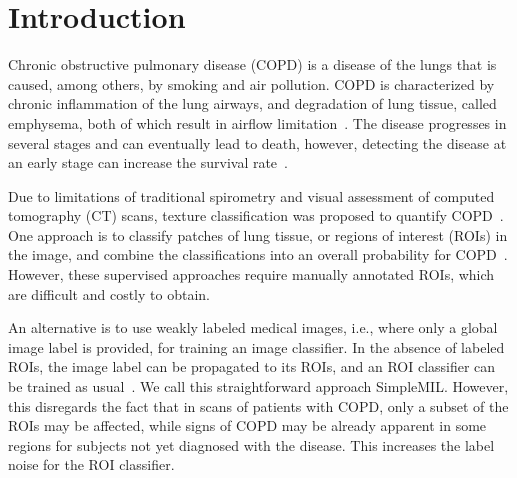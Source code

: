 \documentclass[10pt,conference,a4paper]{IEEEtran}
\begin{document}
%


\section{Introduction}\label{sec:intro}


Chronic obstructive pulmonary disease (COPD) is a disease of the lungs that is caused, among others, by smoking and air pollution. COPD is characterized by chronic inflammation of the lung airways, and degradation of lung tissue, called emphysema, both of which result in airflow limitation~\cite{calverley2000copdearly,rabe2007global}. The disease progresses in several stages and can eventually lead to death, however, detecting the disease at an early stage can increase the survival rate~\cite{pauwels2012global}.

Due to limitations of traditional spirometry and visual assessment of computed tomography (CT) scans, texture classification was proposed to quantify COPD~\cite{park2008texture,sorensen2012texture,srensen2010quantitative,uppaluri1997quantification,mendoza2012emphysema}. One approach is to classify patches of lung tissue, or regions of interest (ROIs) in the image, and combine the classifications into an overall probability for COPD~\cite{park2008texture,srensen2010quantitative}. However, these supervised approaches require manually annotated ROIs, which are difficult and costly to obtain.

An alternative is to use weakly labeled medical images, i.e., where only a global image label is provided, for training an image classifier. In the absence of labeled ROIs, the image label can be propagated to its ROIs, and an ROI classifier can be trained as usual~\cite{sorensen2012texture}. We call this straightforward approach SimpleMIL. However, this disregards the fact that in scans of patients with COPD, only a subset of the ROIs may be affected, while signs of COPD may be already apparent in some regions for subjects not yet diagnosed with the disease. This increases the label noise for the ROI classifier.
\end{document}
